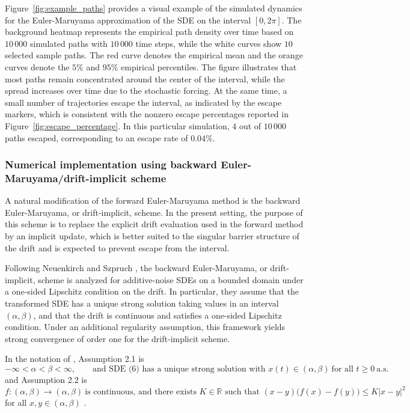 \documentclass[11pt]{article}
\newcommand{\1}{\mathbbm{1}}
\theoremstyle{plain}
\theoremstyle{definition}
\theoremstyle{remark}
\begin{document}
\FloatBarrier 
Figure~\ref{fig:example_paths} provides a visual example of the simulated dynamics for the Euler-Maruyama approximation of the SDE on the interval $[0,2\pi]$. The background heatmap represents the empirical path density over time based on $10\,000$ simulated paths with $10\,000$ time steps, while the white curves show $10$ selected sample paths. The red curve denotes the empirical mean and the orange curves denote the $5\%$ and $95\%$ empirical percentiles. The figure illustrates that most paths remain concentrated around the center of the interval, while the spread increases over time due to the stochastic forcing. At the same time, a small number of trajectories escape the interval, as indicated by the escape markers, which is consistent with the nonzero escape percentages reported in Figure~\ref{fig:escape_percentage}. In this particular simulation, $4$ out of $10\,000$ paths escaped, corresponding to an escape rate of $0.04\%$.

\subsubsection{Numerical implementation using backward Euler-Maruyama/drift-implicit scheme}
A natural modification of the forward Euler-Maruyama method is the backward Euler-Maruyama, or drift-implicit, scheme. In the present setting, the purpose of this scheme is to replace the explicit drift evaluation used in the forward method by an implicit update, which is better suited to the singular barrier structure of the drift and is expected to prevent escape from the interval.

Following Neuenkirch and Szpruch \cite{neuenkirch2014domain}, the backward Euler-Maruyama, or drift-implicit, scheme is analyzed for additive-noise SDEs on a bounded domain under a one-sided Lipschitz condition on the drift. In particular, they assume that the transformed SDE has a unique strong solution taking values in an interval $(\alpha,\beta)$, and that the drift is continuous and satisfies a one-sided Lipschitz condition. Under an additional regularity assumption, this framework yields strong convergence of order one for the drift-implicit scheme.

In the notation of \cite{neuenkirch2014domain}, Assumption 2.1 is
\[
 -\infty < \alpha < \beta < \infty,\qquad
\text{and SDE (6) has a unique strong solution with } x(t)\in(\alpha,\beta)\ \text{for all } t\ge 0 \ \text{a.s.}
\]
and Assumption 2.2 is
\[
f:(\alpha,\beta)\to(\alpha,\beta)\ \text{is continuous, and there exists } K\in\mathbb{R}
\text{ such that }
(x-y)\bigl(f(x)-f(y)\bigr)\le K|x-y|^2
\]
for all $x,y\in(\alpha,\beta)$ \cite{neuenkirch2014domain}.
\end{document}
